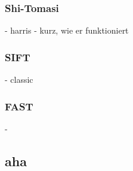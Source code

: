 \documentclass[Bachelorarbeit.tex]{subfiles}
\begin{document}
\subsubsection{Shi-Tomasi}
- harris
- kurz, wie er funktioniert
\subsubsection{SIFT}
- classic
\subsubsection{FAST}
- 



\subsection{aha}

\FloatBarrier
\end{document}
